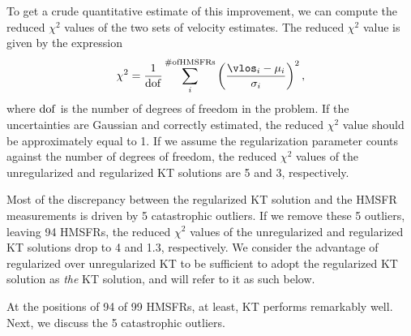 To get a crude quantitative estimate of this improvement, we can compute the reduced $\chi^2$ values of the two sets of velocity estimates. 
The reduced $\chi^2$ value is given by the expression
\begin{equation}
\chi^2 = \frac{1}{\rm{dof}} \sum_i^{\rm{\# of HMSFRs}} \left(\frac{\vlos_i - \mu_i}{\sigma_i} \right)^2, 
\end{equation}
where $\rm{dof}$ is the number of degrees of freedom in the problem.
If the uncertainties are Gaussian and correctly estimated, the reduced $\chi^2$ value should be approximately equal to 1.
If we assume the regularization parameter counts against the number of degrees of freedom, the reduced $\chi^2$ values of the unregularized and regularized KT solutions are 5 and 3, respectively.

Most of the discrepancy between the regularized KT solution and the HMSFR measurements is driven by 5 catastrophic outliers. 
If we remove these 5 outliers, leaving 94 HMSFRs, the reduced $\chi^2$ values of the unregularized and regularized KT solutions drop to 4 and 1.3, respectively. 
We consider the advantage of regularized over unregularized KT to be sufficient to adopt the regularized KT solution as \emph{the} KT solution, and will refer to it as such below.

At the positions of 94 of 99 HMSFRs, at least, KT performs remarkably well. 
Next, we discuss the 5 catastrophic outliers.
